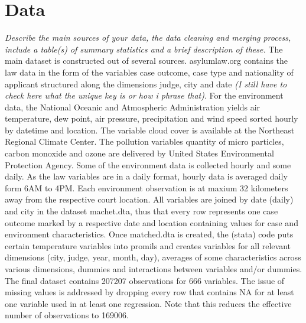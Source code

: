 \documentclass[11pt]{article}
\begin{document}
	\section{Data}
	\textit{Describe the main sources of your data, the data cleaning and merging process,
		include a table(s) of summary statistics and a brief description of these. }
	\newline
	The main dataset is constructed out of several sources. asylumlaw.org contains the law data in the form of the variables case outcome, case type and nationality of applicant structured along the dimensions judge, city and date \textit{(I still have to check here what the unique key is or how i phrase that)}. For the environment data, the National Oceanic and Atmospheric Administration yields air temperature, dew point, air pressure, precipitation and wind speed sorted hourly by datetime and location. The variable cloud cover is available at the Northeast Regional Climate Center. The pollution variables quantity of micro particles, carbon monoxide and ozone are delivered by United States Environmental Protection Agency. Some of the environment data is collected hourly and some daily. As the law variables are in a daily format, hourly data is averaged daily form 6AM to 4PM. Each environment observation is at maxium 32 kilometers away from the respective court location.
	All variables are joined by date (daily) and city in the dataset machet.dta, thus that every row represents one case outcome marked by a respective date and location containing values for case and environment characteristics. \newline
	Once matched.dta is created, the (stata) code puts certain temperature variables into promils and creates variables for all relevant dimensions (city, judge, year, month, day), averages of some characteristics across various dimensions, dummies and interactions between variables and/or dummies. The final dataset contains 207207 observations for 666 variables. The issue of missing values is addressed by dropping every row that contains NA for at least one variable used in at least one regression. Note that this reduces the effective number of observations to 169006.
	\newline	
\end{document}
